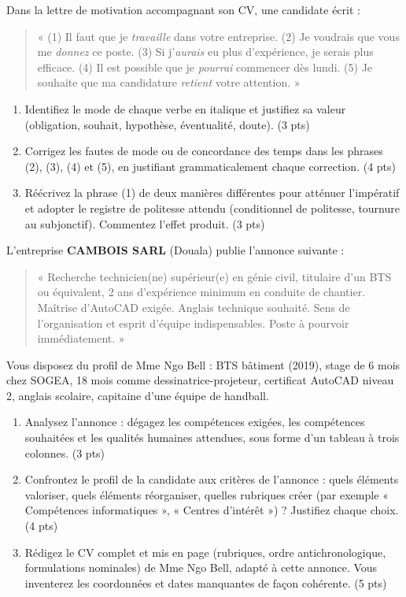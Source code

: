 \documentclass[11pt]{article}
\begin{document}
\begin{exercice}
Dans la lettre de motivation accompagnant son CV, une candidate écrit :
\begin{quote}
« (1) Il faut que je \emph{travaille} dans votre entreprise. (2) Je voudrais que vous me \emph{donnez} ce poste. (3) Si j'\emph{aurais} eu plus d'expérience, je serais plus efficace. (4) Il est possible que je \emph{pourrai} commencer dès lundi. (5) Je souhaite que ma candidature \emph{retient} votre attention. »
\end{quote}
\begin{enumerate}
\item Identifiez le mode de chaque verbe en italique et justifiez sa valeur (obligation, souhait, hypothèse, éventualité, doute). (3 pts)
\item Corrigez les fautes de mode ou de concordance des temps dans les phrases (2), (3), (4) et (5), en justifiant grammaticalement chaque correction. (4 pts)
\item Réécrivez la phrase (1) de deux manières différentes pour atténuer l'impératif et adopter le registre de politesse attendu (conditionnel de politesse, tournure au subjonctif). Commentez l'effet produit. (3 pts)
\end{enumerate}
\end{exercice}

\begin{exercice}
L'entreprise \textbf{CAMBOIS SARL} (Douala) publie l'annonce suivante :
\begin{quote}
« Recherche technicien(ne) supérieur(e) en génie civil, titulaire d'un BTS ou équivalent, 2 ans d'expérience minimum en conduite de chantier. Maîtrise d'AutoCAD exigée. Anglais technique souhaité. Sens de l'organisation et esprit d'équipe indispensables. Poste à pourvoir immédiatement. »
\end{quote}
Vous disposez du profil de Mme Ngo Bell : BTS bâtiment (2019), stage de 6 mois chez SOGEA, 18 mois comme dessinatrice-projeteur, certificat AutoCAD niveau 2, anglais scolaire, capitaine d'une équipe de handball.
\begin{enumerate}
\item Analysez l'annonce : dégagez les compétences exigées, les compétences souhaitées et les qualités humaines attendues, sous forme d'un tableau à trois colonnes. (3 pts)
\item Confrontez le profil de la candidate aux critères de l'annonce : quels éléments valoriser, quels éléments réorganiser, quelles rubriques créer (par exemple « Compétences informatiques », « Centres d'intérêt ») ? Justifiez chaque choix. (4 pts)
\item Rédigez le CV complet et mis en page (rubriques, ordre antichronologique, formulations nominales) de Mme Ngo Bell, adapté à cette annonce. Vous inventerez les coordonnées et dates manquantes de façon cohérente. (5 pts)
\end{enumerate}
\end{exercice}
\end{document}
